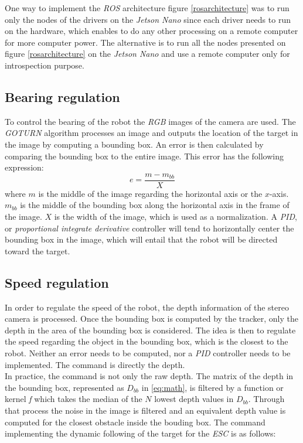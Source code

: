 		\FloatBarrier
		
		One way to implement the \textit{ROS} architecture figure 
		\vref{rosarchitecture}
		was to run only the nodes of the drivers on
		the \textit{Jetson Nano} since each driver needs
		to run on the hardware, which enables to do 
		any other processing on a remote computer
		for more computer power. The alternative is to run 
		all the nodes presented on figure 
		\vref{rosarchitecture} on the \textit{Jetson Nano} and 
		use a remote computer only for
		introspection purpose.
		
		\subsection{Bearing regulation}\label{speed}
			
		To control the bearing of the robot the \textit{RGB} images 
		of the camera are used. The \textit{GOTURN} algorithm 
		processes an image and outputs the location of the 
		target in the image by computing a bounding box. An
		error is then calculated by comparing the bounding box
		to the entire image. This error  has the following expression:
		\begin{equation}
			e = \frac{m - m_{bb}}{X}
		\end{equation}
		where $m$ is the middle of the image regarding the horizontal 
		axis or the $x$-axis. $m_{bb}$ is the middle of the bounding
		box along the horizontal axis in the frame of 
		the image. $X$ is the width of the image, which is used
		as a normalization. A \textit{PID}, or \textit{proportional
		integrate derivative} controller will tend
		to horizontally center the bounding box in the image, which 
		will entail that the robot will be directed toward 
		the target.
		
		\subsection{Speed regulation}
		
		In order to regulate the speed of the robot, the depth 
		information of the stereo camera is processed. Once the 
		bounding box is computed by the tracker, only 
		the depth in the area of the bounding box is considered.
		The idea is then to regulate the speed regarding the object
		in the bounding box, which is the closest to the robot.
		Neither an error needs to be computed, nor a \textit{PID}
		controller 
		needs to be implemented. The command is
		directly the depth.
		\\\indent In practice, the command is not only the raw depth.
		The matrix of the depth in the bounding box, represented 
		as $D_{bb}$ in \eqref{eq:math}, is filtered
		by a function or kernel \textit{f} which takes the median 
		of the $N$ lowest depth values in $D_{bb}$. Through that 
		process the noise in the image is filtered and
		an equivalent depth value is computed for the closest
		obstacle inside the bouding box.
		The command implementing the dynamic following of the target
		for the \textit{ESC} is as follows:
		
